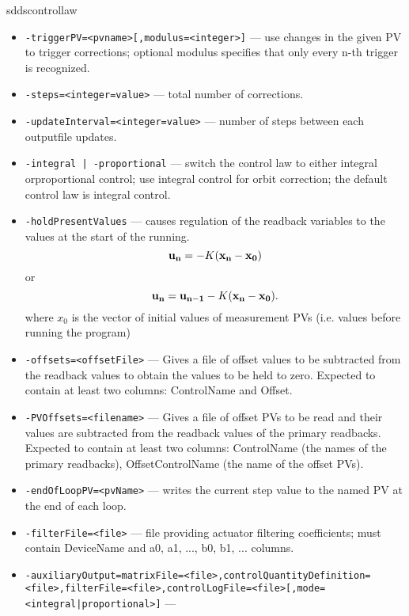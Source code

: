 \begin{sddsprog}{sddscontrollaw}
\begin{itemize}
        \item {\tt -triggerPV=<pvname>[,modulus=<integer>]} --- use changes in the given PV to trigger corrections; optional modulus specifies that only every n-th trigger is recognized.
        \item {\tt -steps=<integer=value>} ---  total number of corrections.
        \item {\tt -updateInterval=<integer=value>} --- number of steps between each outputfile updates.
        \item {\tt -integral | -proportional} --- 
               switch the control law to either integral orproportional
               control;  use integral control for orbit correction; 
               the default control law is integral control.
        \item {\tt -holdPresentValues} ---
               causes regulation of the readback variables to the
               values at the start of the running.
\begin{equation}
{\bf u_n} = - K ({\bf x_n} - {\bf x_0})
\end{equation}
or
\begin{equation}
{\bf u_n} = {\bf u_{n-1}} - K ({\bf x_n} - {\bf x_0}).
\end{equation}
where $x_0$ is the vector of initial values of measurement PVs (i.e. values before running the program)
        \item {\tt -offsets=<offsetFile>} --- Gives a file of offset values to be subtracted from the
               readback values to obtain the values to be held to zero.
               Expected to contain at least two columns: ControlName and Offset. 
        \item {\tt -PVOffsets=<filename>} --- Gives a file of offset PVs to be read and their values are 
               subtracted from the readback values of the primary readbacks.
               Expected to contain at least two columns: ControlName (the names
               of the primary readbacks), OffsetControlName (the name of
               the offset PVs).
        \item {\tt -endOfLoopPV=<pvName>} --- writes the current step value to the named PV at the end of each loop.
        \item {\tt -filterFile=<file>} --- file providing actuator filtering coefficients; must contain DeviceName and a0, a1, ..., b0, b1, ... columns.
        \item {\tt -auxiliaryOutput=matrixFile=<file>,controlQuantityDefinition=<file>,filterFile=<file>,controlLogFile=<file>[,mode=<integral|proportional>]} ---

\end{itemize}
\end{sddsprog}
